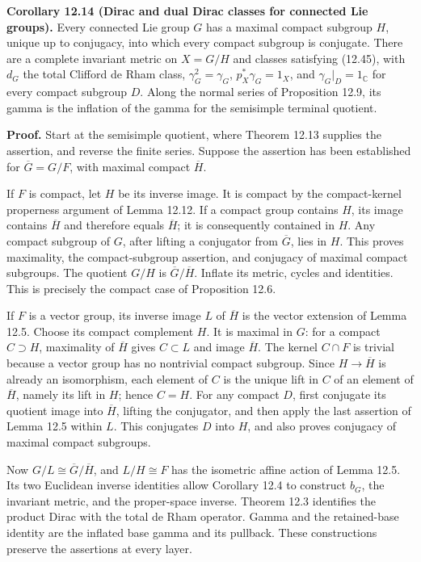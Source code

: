 \documentclass[
  11pt,
]{article}
\begin{document}
\textbf{Corollary 12.14 (Dirac and dual Dirac classes for connected Lie
groups).} Every connected Lie group \(G\) has a maximal compact subgroup
\(H\), unique up to conjugacy, into which every compact subgroup is
conjugate. There are a complete invariant metric on \(X=G/H\) and
classes satisfying (12.45), with \(d_G\) the total Clifford de Rham
class, \(\gamma_G^2=\gamma_G\), \(p_X^*\gamma_G=1_X\), and
\(\gamma_G|_D=1_{\mathbb C}\) for every compact subgroup \(D\). Along
the normal series of Proposition 12.9, its gamma is the inflation of the
gamma for the semisimple terminal quotient.

\textbf{Proof.} Start at the semisimple quotient, where Theorem 12.13
supplies the assertion, and reverse the finite series. Suppose the
assertion has been established for \(\overline G=G/F\), with maximal
compact \(\overline H\).

If \(F\) is compact, let \(H\) be its inverse image. It is compact by
the compact-kernel properness argument of Lemma 12.12. If a compact
group contains \(H\), its image contains \(\overline H\) and therefore
equals \(\overline H\); it is consequently contained in \(H\). Any
compact subgroup of \(G\), after lifting a conjugator from
\(\overline G\), lies in \(H\). This proves maximality, the
compact-subgroup assertion, and conjugacy of maximal compact subgroups.
The quotient \(G/H\) is \(\overline G/\overline H\). Inflate its metric,
cycles and identities. This is precisely the compact case of Proposition
12.6.

If \(F\) is a vector group, its inverse image \(L\) of \(\overline H\)
is the vector extension of Lemma 12.5. Choose its compact complement
\(H\). It is maximal in \(G\): for a compact \(C\supset H\), maximality
of \(\overline H\) gives \(C\subset L\) and image \(\overline H\). The
kernel \(C\cap F\) is trivial because a vector group has no nontrivial
compact subgroup. Since \(H\to\overline H\) is already an isomorphism,
each element of \(C\) is the unique lift in \(C\) of an element of
\(\overline H\), namely its lift in \(H\); hence \(C=H\). For any
compact \(D\), first conjugate its quotient image into \(\overline H\),
lifting the conjugator, and then apply the last assertion of Lemma 12.5
within \(L\). This conjugates \(D\) into \(H\), and also proves
conjugacy of maximal compact subgroups.

Now \(G/L\cong\overline G/\overline H\), and \(L/H\cong F\) has the
isometric affine action of Lemma 12.5. Its two Euclidean inverse
identities allow Corollary 12.4 to construct \(b_G\), the invariant
metric, and the proper-space inverse. Theorem 12.3 identifies the
product Dirac with the total de Rham operator. Gamma and the
retained-base identity are the inflated base gamma and its pullback.
These constructions preserve the assertions at every layer.
\end{document}
